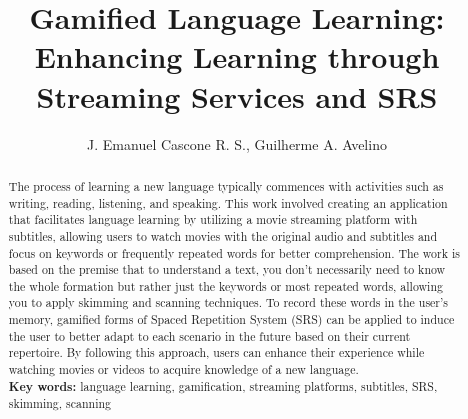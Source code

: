 \documentclass[12pt]{article}
\title{Gamified Language Learning: Enhancing Learning through Streaming Services and SRS}
\author{J. Emanuel Cascone R. S.\inst{1}, Guilherme A. Avelino\inst{1} }
\begin{document}
 

\maketitle

\begin{abstract} 
 The process of learning a new language typically commences with activities such as writing, reading, listening, and speaking. This work involved creating an application that facilitates language learning by utilizing a movie streaming platform with subtitles, allowing users to watch movies with the original audio and subtitles and focus on keywords or frequently repeated words for better comprehension. The work is based on the premise that to understand a text, you don't necessarily need to know the whole formation but rather just the keywords or most repeated words, allowing you to apply skimming and scanning techniques. To record these words in the user's memory, gamified forms of Spaced Repetition System (SRS) can be applied to induce the user to better adapt to each scenario in the future based on their current repertoire. By following this approach, users can enhance their experience while watching movies or videos to acquire knowledge of a new language. \\
  \textbf{Key words:} language learning, gamification, streaming platforms, subtitles, SRS, skimming, scanning
\end{abstract} 
\end{document}
